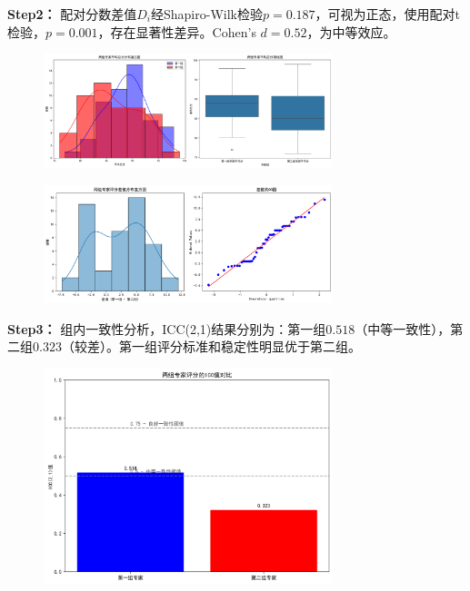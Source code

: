 \documentclass[withoutpreface,bwprint]{cumcmthesis}
\begin{document}
\textbf{Step2：} 配对分数差值$D_i$经Shapiro-Wilk检验$ p = 0.187 $，可视为正态，使用配对t检验，$p=0.001$，存在显著性差异。Cohen's $d=0.52$，为中等效应。


\begin{figure}[ht]
\centering
\includegraphics[width=0.75\textwidth]{figures/descriptive_statistics.png}
\label{fig:单图}
\end{figure}

\begin{figure}[ht]
\centering
\includegraphics[width=0.75\textwidth]{figures/normality_test.png}
\label{fig:单图}
\end{figure}

\textbf{Step3：} 组内一致性分析，ICC(2,1)结果分别为：第一组$0.518$（中等一致性），第二组$0.323$（较差）。第一组评分标准和稳定性明显优于第二组。


\begin{figure}[H]
\centering
\includegraphics[width=0.75\textwidth]{figures/icc_analysis.png}
\label{fig:单图}
\end{figure}
\end{document}
